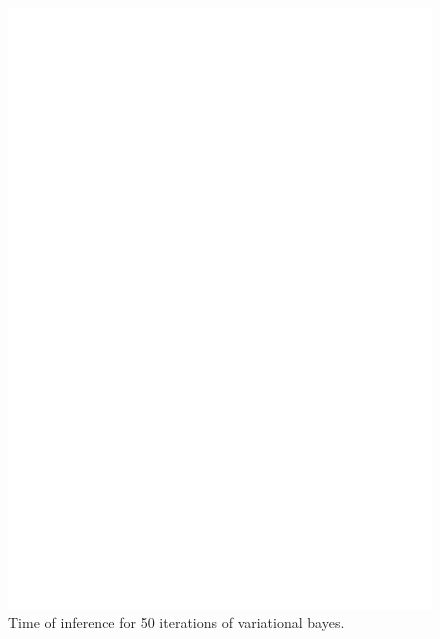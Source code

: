 \begin{figure}[h]
\label{fig:time}
\includegraphics[scale=0.4]{results/time.eps}
\caption{Time of inference for 50 iterations of variational bayes.}
\end{figure}

